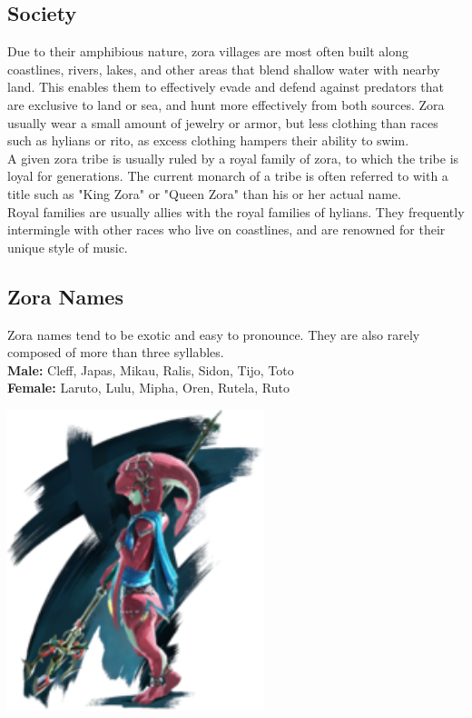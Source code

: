 \documentclass[10pt,twoside,twocolumn,openany]{book}
\begin{document}
\subsection{Society}

Due to their amphibious nature, zora villages are most often built along coastlines, rivers, lakes, and other areas that blend shallow water with nearby land. This enables them to effectively evade and defend against predators that are exclusive to land or sea, and hunt more effectively from both sources. Zora usually wear a small amount of jewelry or armor, but less clothing than races such as hylians or rito, as excess clothing hampers their ability to swim.\\
A given zora tribe is usually ruled by a royal family of zora, to which the tribe is loyal for generations. The current monarch of a tribe is often referred to with a title such as "King Zora" or "Queen Zora" than his or her actual name.\\
Royal families are usually allies with the royal families of hylians. They frequently intermingle with other races who live on coastlines, and are renowned for their unique style of music.

\subsection{Zora Names}
Zora names tend to be exotic and easy to pronounce. They are also rarely composed of more than three syllables. \\
\textbf{Male:} Cleff, Japas, Mikau, Ralis, Sidon, Tijo, Toto \\
\textbf{Female:} Laruto, Lulu, Mipha, Oren, Rutela, Ruto 
\newpage
\begin{center}
	\includegraphics[width=75mm,scale=0.5]{img/mipha.png} \\
\end{center}
\end{document}
